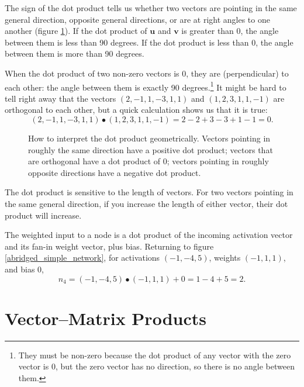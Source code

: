 The sign of the dot product tells us whether two vectors are pointing in the same general direction, opposite general directions, or are at right angles to one another (figure \ref{abridged_dot_directions}). If the dot product of $\mathbf{u}$ and $\mathbf{v}$ is greater than $0$, the angle between them is less than 90 degrees. If the dot product is less than $0$, the angle between them is more than 90 degrees.

When the dot product of two non-zero vectors is $0$, they are  (perpendicular) to each other: the angle between them is exactly 90 degrees.\footnote{They must be non-zero because the dot product of any vector with the zero vector is $0$, but the zero vector has no direction, so there is no angle between them.} It might be hard to tell right away that the vectors $(2,-1,1,-3,1,1)$ and $(1,2,3,1,1,-1)$ are orthogonal to each other, but a quick calculation shows us that it is true:
\[
(2,-1,1,-3,1,1)\bullet(1,2,3,1,1,-1)=2-2+3-3+1-1=0.
\]

\begin{figure}[htbp]
\centering
{}
\caption[Scott Hotton.]{How to interpret the dot product geometrically. Vectors pointing in roughly the same direction have a positive dot product; vectors that are orthogonal have a dot product of $0$; vectors pointing in roughly opposite directions have a negative dot product.}
\label{abridged_dot_directions}
\end{figure}

The dot product is sensitive to the length of vectors. For two vectors pointing in the same general direction, if you increase the length of either vector, their dot product will increase.


The weighted input to a node is a dot product of the incoming activation vector and its fan-in weight vector, plus bias. Returning to figure \ref{abridged_simple_network}, for activations $(-1,-4,5)$, weights $(-1,1,1)$, and bias $0$,
\[
n_4=(-1,-4,5)\bullet(-1,1,1)+0=1-4+5=2.
\]

\section{Vector--Matrix Products}


